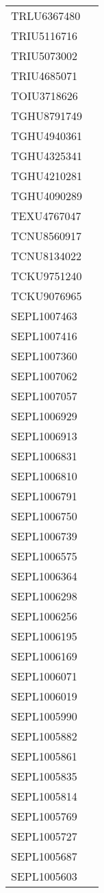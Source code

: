 \documentclass[a4paper]{report}
\begin{document}
\begin{longtable}{| p{4cm} | p{10cm} |}
	TRLU6367480  &  \\
	TRIU5116716  &  \\
	TRIU5073002  &  \\
	TRIU4685071  &  \\
	TOIU3718626  &  \\
	TGHU8791749  &  \\
	TGHU4940361  &  \\
	TGHU4325341  &  \\
	TGHU4210281  &  \\
	TGHU4090289  &  \\
	TEXU4767047  &  \\
	TCNU8560917  &  \\
	TCNU8134022  &  \\
	TCKU9751240  &  \\
	TCKU9076965  &  \\
	SEPL1007463  &  \\
	SEPL1007416  &  \\
	SEPL1007360  &  \\
	SEPL1007062  &  \\
	SEPL1007057  &  \\
	SEPL1006929  &  \\
	SEPL1006913  &  \\
	SEPL1006831  &  \\
	SEPL1006810  &  \\
	SEPL1006791  &  \\
	SEPL1006750  &  \\
	SEPL1006739  &  \\
	SEPL1006575  &  \\
	SEPL1006364  &  \\
	SEPL1006298  &  \\
	SEPL1006256  &  \\
	SEPL1006195  &  \\
	SEPL1006169  &  \\
	SEPL1006071  &  \\
	SEPL1006019  &  \\
	SEPL1005990  &  \\
	SEPL1005882  &  \\
	SEPL1005861  &  \\
	SEPL1005835  &  \\
	SEPL1005814  &  \\
	SEPL1005769  &  \\
	SEPL1005727  &  \\
	SEPL1005687  &  \\
	SEPL1005603  &  \\

\end{longtable}
\end{document}

